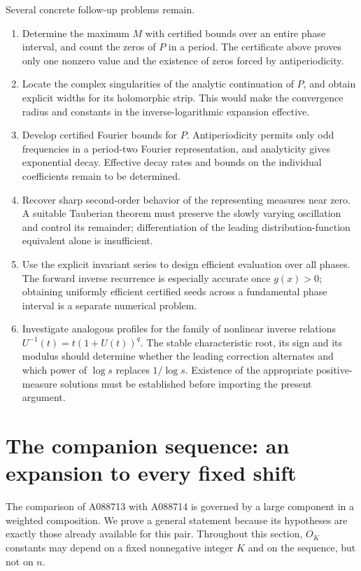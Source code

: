 \documentclass[11pt]{article}
\numberwithin{equation}{section}
\theoremstyle{definition}
\theoremstyle{remark}
\begin{document}
Several concrete follow-up problems remain.
\begin{enumerate}
\item Determine the maximum $M$ with certified bounds over an entire
phase interval, and count the zeros of $P$ in a period. The certificate
above proves only one nonzero value and the existence of zeros forced
by antiperiodicity.
\item Locate the complex singularities of the analytic continuation of
$P$, and obtain explicit widths for its holomorphic strip. This would
make the convergence radius and constants in the inverse-logarithmic
expansion effective.
\item Develop certified Fourier bounds for $P$. Antiperiodicity permits
only odd frequencies in a period-two Fourier representation, and
analyticity gives exponential decay. Effective decay rates and bounds
on the individual coefficients remain to be determined.
\item Recover sharp second-order behavior of the representing measures
near zero. A suitable Tauberian theorem must preserve the slowly
varying oscillation and control its remainder; differentiation of the
leading distribution-function equivalent alone is insufficient.
\item Use the explicit invariant series to design efficient evaluation
over all phases. The forward inverse recurrence is especially accurate
once $g(x)>0$; obtaining uniformly efficient certified seeds across a
fundamental phase interval is a separate numerical problem.
\item Investigate analogous profiles for the family of nonlinear
inverse relations $U^{-1}(t)=t(1+U(t))^q$. The stable characteristic
root, its sign and its modulus should determine whether the leading
correction alternates and which power of $\log s$ replaces
$1/\log s$. Existence of the appropriate positive-measure solutions
must be established before importing the present argument.
\end{enumerate}



\section{The companion sequence: an expansion to every fixed shift}
\label{gdy:ren:section}

The comparison of A088713 with A088714 is governed by a large component
in a weighted composition. We prove a general statement because its
hypotheses are exactly those already available for this pair.
Throughout this section, $O_K$ constants may depend on a fixed nonnegative
integer $K$ and on the sequence, but not on $n$.
\end{document}
